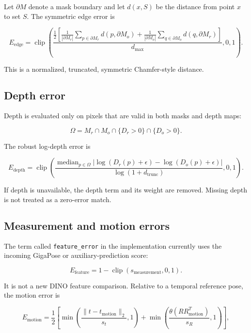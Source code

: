 \documentclass[11pt]{article}
\newcommand{\clip}{\operatorname{clip}}
\newcommand{\median}{\operatorname{median}}
\begin{document}
Let $\partial M$ denote a mask boundary and let $d(x,S)$ be the distance from
point $x$ to set $S$. The symmetric edge error is

\begin{equation}
E_{\mathrm{edge}}=\clip\left(
\frac{
\frac12\left[
\frac{1}{|\partial M_r|}\sum_{p\in\partial M_r}d(p,\partial M_o)
+\frac{1}{|\partial M_o|}\sum_{q\in\partial M_o}d(q,\partial M_r)
\right]
}{d_{\max}},
0,1
\right).
\end{equation}

This is a normalized, truncated, symmetric Chamfer-style distance.

\subsection{Depth error}

Depth is evaluated only on pixels that are valid in both masks and depth maps:

\begin{equation}
\Omega=M_r\cap M_o\cap\{D_r>0\}\cap\{D_o>0\}.
\end{equation}

The robust log-depth error is

\begin{equation}
E_{\mathrm{depth}}=\clip\left(
\frac{
\median_{p\in\Omega}
\left|\log(D_r(p)+\epsilon)-\log(D_o(p)+\epsilon)\right|
}{\log(1+d_{\mathrm{trunc}})},
0,1
\right).
\end{equation}

If depth is unavailable, the depth term and its weight are removed. Missing
depth is not treated as a zero-error match.

\subsection{Measurement and motion errors}

The term called \texttt{feature\_error} in the implementation currently uses
the incoming GigaPose or auxiliary-prediction score:

\begin{equation}
E_{\mathrm{feature}}=1-\clip(s_{\mathrm{measurement}},0,1).
\end{equation}

It is not a new DINO feature comparison. Relative to a temporal reference
pose, the motion error is

\begin{equation}
E_{\mathrm{motion}}=\frac12\left[
\min\left(\frac{\lVert t-t_{\mathrm{motion}}\rVert_2}{s_t},1\right)
+\min\left(
\frac{\theta(RR_{\mathrm{motion}}^T)}{s_R},1
\right)
\right],
\end{equation}
\end{document}
